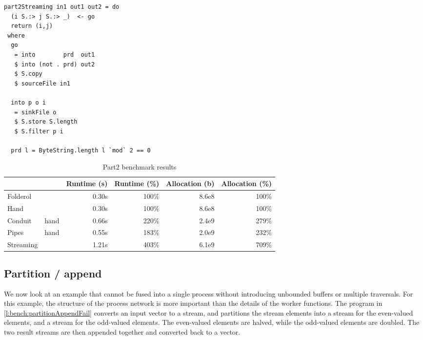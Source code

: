 \begin{lstlisting}[float,label=l:a:bench:part2Streaming,caption=Streaming implementation of \Hs/part2/]
part2Streaming in1 out1 out2 = do
  (i S.:> j S.:> _)  <- go
  return (i,j)
 where
  go
   = into        prd  out1
   $ into (not . prd) out2
   $ S.copy
   $ sourceFile in1

  into p o i
   = sinkFile o
   $ S.store S.length
   $ S.filter p i

  prd l = ByteString.length l `mod` 2 == 0
\end{lstlisting}


\begin{table}
\begin{center}
\begin{tabular}{ll|rrrr}
& & Runtime (s)  & Runtime (\%) & Allocation (b) & Allocation (\%) \\
\hline
Folderol &          & 0.30s &   100\% & 8.6e8 & 100\% \\
Hand     &          & 0.30s &   100\% & 8.6e8 & 100\% \\
Conduit & hand      & 0.66s &   220\% & 2.4e9 & 279\% \\
Pipes  & hand       & 0.55s &   183\% & 2.0e9 & 232\% \\
Streaming &         & 1.21s &   403\% & 6.1e9 & 709\% \\
\end{tabular}
\end{center}
\caption[Part2 benchmark results]{Part2 benchmark results}
\label{table:bench:part2}
\end{table}


\subsection{Partition / append}
\label{s:Benchmarks:partitionAppend}

We now look at an example that cannot be fused into a single process without introducing unbounded buffers or multiple traversals.
For this example, the structure of the process network is more important than the details of the worker functions.
The program in \cref{l:bench:partitionAppendFail} converts an input vector to a stream, and partitions the stream elements into a stream for the even-valued elements, and a stream for the odd-valued elements.
The even-valued elements are halved, while the odd-valued elements are doubled.
The two result streams are then appended together and converted back to a vector.

